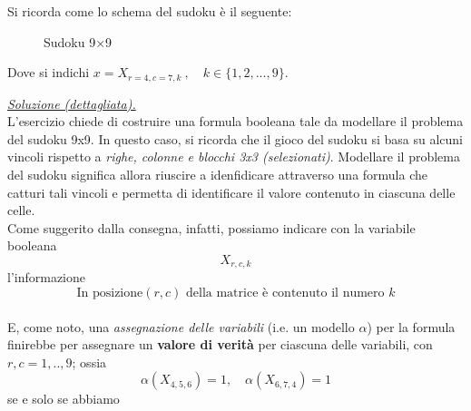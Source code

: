 \documentclass[a4paper,10pt]{article}
\begin{document}
{\begin{itemize}[label=, leftmargin=0pt]
Si ricorda come lo schema del sudoku è il seguente:

\begin{figure}[h]
\begin{center}
\caption{Sudoku 9×9} 
\end{center}
\end{figure}


Dove si indichi $x = X_{r=4,c=7,k}\ , \quad k\in\{1,2,...,9\}$.
    
\begin{osservazioni}
    \underline{\textit{Soluzione (dettagliata).}}\\
    L'esercizio chiede di costruire una formula booleana tale da modellare il problema del sudoku 9x9. In questo caso, si ricorda che il gioco del sudoku si basa su alcuni vincoli rispetto a \textit{righe, colonne e blocchi 3x3 (selezionati)}. Modellare il problema del sudoku significa allora riuscire a idenfidicare attraverso una formula che catturi tali vincoli e permetta di identificare il valore contenuto in ciascuna delle celle.\\

    Come suggerito dalla consegna, infatti, possiamo indicare con la variabile booleana $$X_{r,c,k}$$ l'informazione $$\text{In\ posizione} (r,c) \text{\ della\ matrice\ è\ contenuto\ il\ numero \ }k$$\\
    
    E, come noto, una \textit{assegnazione delle variabili} (i.e. un modello $\alpha$) per la formula finirebbe per assegnare un \textbf{valore di verità} per ciascuna delle variabili, con $r,c=1,..,9$; ossia $$\alpha(X_{4,5,6})=1,\quad \alpha(X_{6,7,4})=1$$ se e solo se abbiamo

    \begin{center}
\end{center}
\end{osservazioni}
\end{itemize}}
\end{document}
